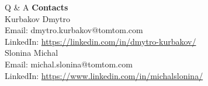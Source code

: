\documentclass{beamer}
\begin{document}
\begin{frame}{Q \& A}
\textbf{Contacts}\\
\vfill
Kurbakov Dmytro\\
Email: dmytro.kurbakov@tomtom.com\\
LinkedIn: \url{https://linkedin.com/in/dmytro-kurbakov/}\\
\vfill
Slonina Michal\\
Email: michal.slonina@tomtom.com\\
LinkedIn: \url{https://www.linkedin.com/in/michalslonina/}\\

\end{frame}
\end{document}
